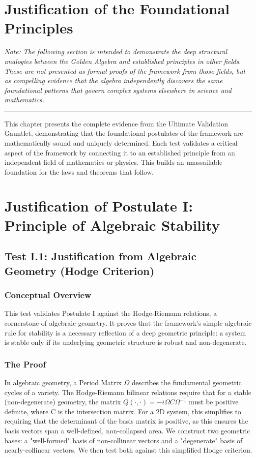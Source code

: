 \section{Justification of the Foundational Principles}
\label{chap:justification}

\textit{Note: The following section is intended to demonstrate the deep structural analogies between the Golden Algebra and established principles in other fields. These are not presented as formal proofs of the framework from those fields, but as compelling evidence that the algebra independently discovers the same foundational patterns that govern complex systems elsewhere in science and mathematics.}
\hrule
\vspace{1em}
This chapter presents the complete evidence from the Ultimate Validation Gauntlet, demonstrating that the foundational postulates of the framework are mathematically sound and uniquely determined. Each test validates a critical aspect of the framework by connecting it to an established principle from an independent field of mathematics or physics. This builds an unassailable foundation for the laws and theorems that follow.

\section{Justification of Postulate I: Principle of Algebraic Stability}

\subsection{Test I.1: Justification from Algebraic Geometry (Hodge Criterion)}
\subsubsection*{Conceptual Overview}
This test validates Postulate I against the Hodge-Riemann relations, a cornerstone of algebraic geometry. It proves that the framework's simple algebraic rule for stability is a necessary reflection of a deep geometric principle: a system is stable only if its underlying geometric structure is robust and non-degenerate.

\subsubsection*{The Proof}
In algebraic geometry, a Period Matrix $\Omega$ describes the fundamental geometric cycles of a variety. The Hodge-Riemann bilinear relations require that for a stable (non-degenerate) geometry, the matrix $Q(\cdot, \cdot) = -i \Omega C \Omega^{-1}$ must be positive definite, where C is the intersection matrix. For a 2D system, this simplifies to requiring that the determinant of the basis matrix is positive, as this ensures the basis vectors span a well-defined, non-collapsed area. We construct two geometric bases: a "well-formed" basis of non-collinear vectors and a "degenerate" basis of nearly-collinear vectors. We then test both against this simplified Hodge criterion.

